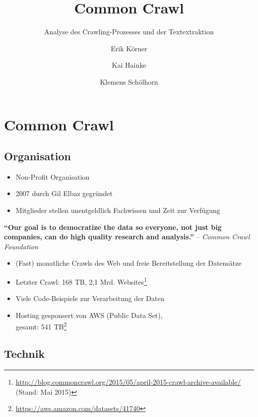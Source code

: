 \documentclass[a4paper,12pt,titlepage=false]{scrreprt}
\title{\vspace{3cm}Common Crawl}
\subtitle{Analyse des Crawling-Prozesses und der Textextraktion}
\author{Erik Körner \and Kai Hainke \and Klemens Schölhorn}
\begin{document}
\maketitle
\vspace{2cm}
\tableofcontents

\chapter{Common Crawl}

\section{Organisation}

\begin{itemize}
    \item Non-Profit Organisation
    \item 2007 durch Gil Elbaz gegründet
    \item Mitglieder stellen unentgeldlich Fachwissen und Zeit zur Verfügung
\end{itemize}
\textbf{``Our goal is to democratize the data so everyone, not just big companies, can do high quality research and analysis.''}
\hfill-- \textit{Common Crawl Foundation}

\begin{itemize}
    \item (Fast) monatliche Crawls des Web und freie Bereitstellung der Datensätze
    \item Letzter Crawl: 168 TB, 2,1 Mrd. Websites\footnote{\url{http://blog.commoncrawl.org/2015/05/april-2015-crawl-archive-available/} (Stand: Mai 2015)}
    \item Viele Code-Beispiele zur Verarbeitung der Daten
    \item Hosting gesponsert von AWS (Public Data Set),\\gesamt: 541 TB\footnote{\url{https://aws.amazon.com/datasets/41740}}
\end{itemize}


\section{Technik}
\end{document}
